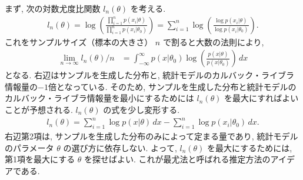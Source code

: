 \documentclass{jarticle}
\begin{document}
まず, 次の対数尤度比関数 $l_n(\theta)$ を考える. 
\begin{align}
l_n(\theta) = \log \left( \frac{\prod_{i=1}^{n}p(x_i|\theta)}{\prod_{i=1}^{n}p(x_i|\theta_0)} \right) = \sum_{i=1}^{n}\log \left(\frac{\log p(x_i| \theta)}{\log p(x_i| \theta_0)}\right).
\end{align}
これをサンプルサイズ（標本の大きさ） $n$ で割ると大数の法則により, 
\begin{align}
\lim_{n\to \infty} l_n(\theta)/n &= \int_{-\infty}^{\infty} p(x|\theta_0)\log \left(\frac{p(x| \theta)}{ p(x| \theta_0)}\right) \, dx
\end{align}
となる. 右辺はサンプルを生成した分布と, 統計モデルのカルバック・ライブラ情報量の$-1$倍となっている. そのため, サンプルを生成した分布と統計モデルのカルバック・ライブラ情報量を最小にするためには $l_n(\theta)$ を最大にすればよいことが予想される.
$l_n(\theta)$ の式を少し変形する. 
\begin{align}
 l_n(\theta)= \sum_{i=1}^{n}\log p(x| \theta) \, dx -  \sum_{i=1}^{n}\log p(x_i| \theta_0)\, dx.
 \label{eqln}
\end{align}
右辺第2項は, サンプルを生成した分布のみによって定まる量であり, 統計モデルのパラメータ $\theta$ の選び方に依存しない. 
よって, $l_n(\theta)$ を最大にするためには, 第1項を最大にする $\theta$ を探せばよい. これが最尤法と呼ばれる推定方法のアイデアである.
\end{document}
